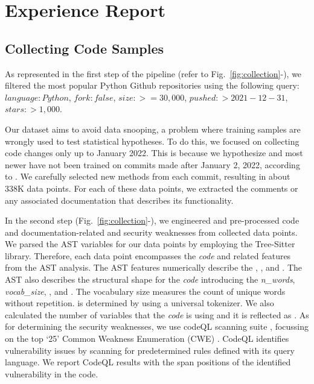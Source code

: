 \section{Experience Report}\label{sec:experience}


\subsection{Collecting Code Samples}


As represented in the first step of the pipeline (refer to Fig.~\ref{fig:collection}-),  we filtered the most popular Python Github repositories using the following query: $language:Python$, $fork:false$, $size:>=30,000$,  $pushed:>2021-12-31$, $stars:>1,000$.

Our dataset aims to avoid data snooping, a problem where training samples are wrongly used to test statistical hypotheses. To do this, we focused on collecting code changes only up to January 2022. This is because we hypothesize \chatgpt and most newer \llms have not been trained on commits made after January 2, 2022, according to \cite{openai2023gpt4}. We carefully selected new methods from each commit, resulting in about 338K data points. For each of these data points, we extracted the comments or any associated documentation that describes its functionality.

In the second step (Fig.~\ref{fig:collection}-), we engineered and pre-processed code and documentation-related and security weaknesses from collected data points. We parsed the AST variables for our data points by employing the Tree-Sitter library. Therefore, each data point encompasses the \textit{code} and related features from the AST analysis. The AST features numerically describe the \ASTerrors, \ASTlevels, and \ASTnodes. The AST also describes the structural shape for the \textit{code} introducing the \textit{n\_words}, \textit{vocab\_size}, \tokenCount, and \whitespaces. The vocabulary size measures the count of unique words without repetition. \tokenCount is determined by using a universal tokenizer. We also calculated the number of variables that the \textit{code} is using and it is reflected as \identifiers. As for determining the security weaknesses, we use codeQL scanning suite \cite{noauthor_codeql_nodate}, focussing on the top `25'  Common Weakness Enumeration (CWE) \cite{noauthor_cwe_nodate}. CodeQL identifies vulnerability issues by scanning for predetermined rules defined with its query language. We report CodeQL results with the span positions of the identified vulnerability in the code. 

